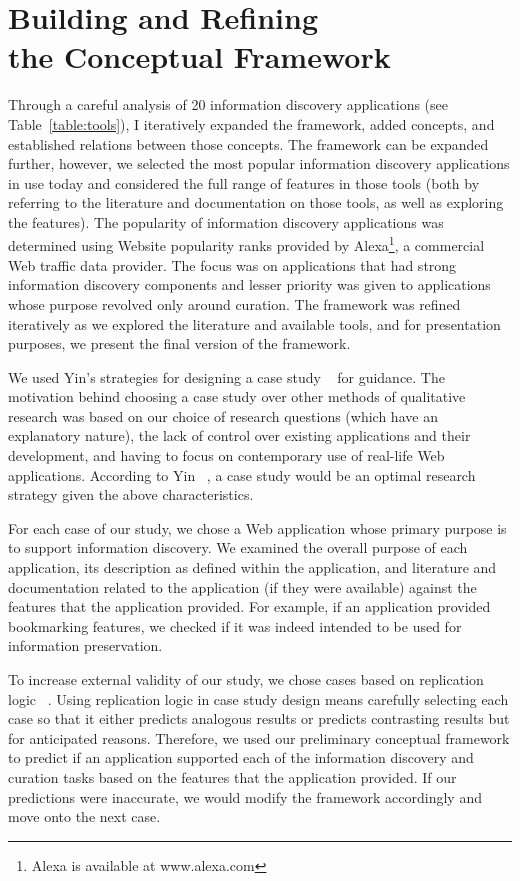 {\section{Building and Refining \\the Conceptual Framework}
Through a careful analysis of 20 information discovery applications (see Table~\ref{table:tools}), I iteratively expanded the framework, added concepts, and established relations between those concepts. The framework can be expanded further, however, we selected the most popular information discovery applications in use today and considered the full range of features in those tools (both by referring to the literature and documentation on those tools, as well as exploring the features). The popularity of information discovery applications was determined using Website popularity ranks provided by Alexa\footnote[1]{Alexa is available at www.alexa.com}, a commercial Web traffic data provider. The focus was on applications that had strong information discovery components and lesser priority was given to applications whose purpose revolved only around curation. The framework was refined iteratively as we explored the literature and available tools, and for presentation purposes, we present the final version of the framework.

We used Yin’s strategies for designing a case study ~\cite{yin} for guidance. The motivation behind choosing a case study over other methods of qualitative research was based on our choice of research questions (which have an explanatory nature), the lack of control over existing applications and their development, and having to focus on contemporary use of real-life Web applications. According to Yin ~\cite{yin}, a case study would be an optimal research strategy given the above characteristics.

For each case of our study, we chose a Web application whose primary purpose is to support information discovery. We examined the overall purpose of each application, its description as defined within the application, and literature and documentation related to the application (if they were available) against the features that the application provided. For example, if an application provided bookmarking features, we checked if it was indeed intended to be used for information preservation. 

To increase external validity of our study, we chose cases based on replication logic ~\cite{yin}. Using replication logic in case study design means carefully selecting each case so that it either predicts analogous results or predicts contrasting results but for anticipated reasons. Therefore, we used our preliminary conceptual framework to predict if an application supported each of the information discovery and curation tasks based on the features that the application provided. If our predictions were inaccurate, we would modify the framework accordingly and move onto the next case. 

}
